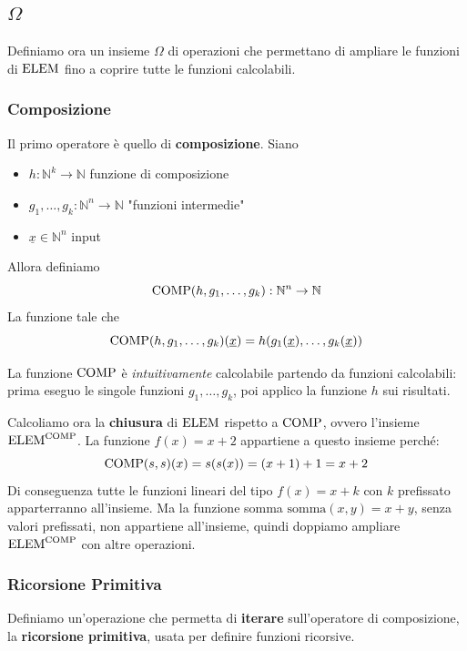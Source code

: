 \subsection{$\Omega$}
Definiamo ora un insieme $\Omega$ di operazioni che permettano di ampliare le funzioni di $\text{ELEM}$ fino a coprire tutte le funzioni calcolabili.

\subsubsection{Composizione}
Il primo operatore è quello di \textbf{composizione}. Siano
\begin{itemize}
	\item $h: \mathbb{N}^k \rightarrow \mathbb{N}$ funzione di composizione
	\item $g_1, \dots, g_k: \mathbb{N}^n \rightarrow \mathbb{N}$ "funzioni intermedie"
	\item $\underline{x} \in \mathbb{N}^n$ input
\end{itemize}
Allora definiamo 
$$ \text{COMP} (h, g_1, \dots, g_k): \mathbb{N}^n \rightarrow \mathbb{N} $$
La funzione tale che
$$ \text{COMP} (h, g_1, \dots, g_k) (\underline{x}) = h(g_1(\underline{x}), \dots, g_k (\underline{x})) $$

\begin{center}
	
\end{center}

La funzione $\text{COMP}$ è \textit{intuitivamente} calcolabile partendo da funzioni calcolabili: prima eseguo le singole funzioni $g_1, \dots, g_k$, poi applico la funzione $h$ sui risultati.

Calcoliamo ora la \textbf{chiusura} di $\text{ELEM}$ rispetto a $\text{COMP}$, ovvero l'insieme $\text{ELEM}^{\text{COMP}}$. La funzione $f(x) = x + 2$ appartiene a questo insieme perché:
$$ \text{COMP}(s,s)(x) = s(s(x)) = (x + 1) + 1 = x + 2 $$
Di conseguenza tutte le funzioni lineari del tipo $f(x) = x + k$ con $k$ prefissato apparterranno all'insieme. Ma la funzione somma $\text{somma}(x,y) = x+y$, senza valori prefissati, non appartiene all'insieme, quindi doppiamo ampliare $\text{ELEM}^{\text{COMP}}$ con altre operazioni.

\subsubsection{Ricorsione Primitiva}
Definiamo un'operazione che permetta di \textbf{iterare} sull'operatore di composizione, la \textbf{ricorsione primitiva}, usata per definire funzioni ricorsive.

